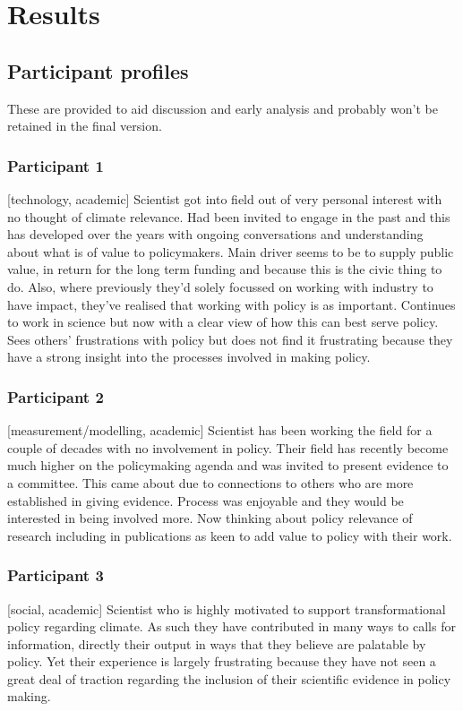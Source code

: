\chapter{Results}\label{ch:results}
\section{Participant profiles}\label{sec:profiles}
These are provided to aid discussion and early analysis and probably won't be retained in the final version.

\subsection{Participant 1}\label{sec:p1}
[technology, academic] Scientist got into field out of very personal interest with no thought of climate relevance. Had been invited to engage in the past and this has developed over the years with ongoing conversations and understanding about what is of value to policymakers. Main driver seems to be to supply public value, in return for the long term funding and because this is the civic thing to do. Also, where previously they'd solely focussed on working with industry to have impact, they've realised that working with policy is as important. Continues to work in science but now with a clear view of how this can best serve policy. Sees others' frustrations with policy but does not find it frustrating because they have a strong insight into the processes involved in making policy.

\subsection{Participant 2}\label{sec:p2}
[measurement/modelling, academic] Scientist has been working the field for a couple of decades with no involvement in policy. Their field has recently become much higher on the policymaking agenda and was invited to present evidence to a committee. This came about due to connections to others who are more established in giving evidence. Process was enjoyable and they would be interested in being involved more. Now thinking about policy relevance of research including in publications as keen to add value to policy with their work.

\subsection{Participant 3}\label{sec:p3}
[social, academic] Scientist who is highly motivated to support transformational policy regarding climate. As such they have contributed in many ways to calls for information, directly their output in ways that they believe are palatable by policy. Yet their experience is largely frustrating because they have not seen a great deal of traction regarding the inclusion of their scientific evidence in policy making.

